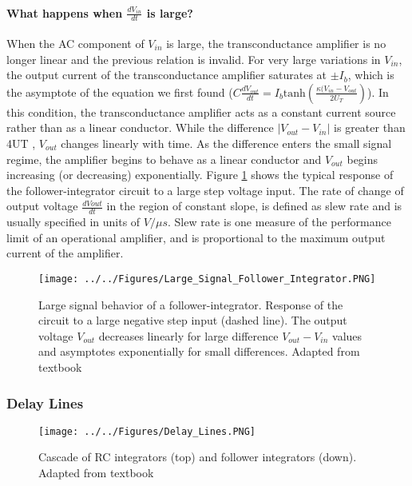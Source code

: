 \paragraph{What happens when $\frac{dV_{in}}{dt}$ is large?}
When the AC component of $V_{in}$ is large, the transconductance amplifier is no longer linear and the previous relation is invalid. For very large variations in $V_{in}$, the output current of the transconductance amplifier saturates at $\pm I_b$, which is the asymptote of the equation we first found ($C \frac{dV_{out}}{dt} = I_b \mathrm{tanh}(\frac{\kappa (V_{in} - V_{out}}{2 U_T})$).  In this condition, the transconductance amplifier
acts as a constant current source rather than as a linear conductor. While the difference $|V_{out} -   V_{in}|$ is greater than 4UT , $V_{out}$ changes linearly with time. As the difference enters the small signal regime, the amplifier begins to behave as a linear conductor and $V_{out}$ begins increasing (or decreasing) exponentially. 
Figure \ref{fig:Large_Signal_Follower_Integrator} shows the typical response of the follower-integrator circuit to
a large step voltage input. The rate of change of output voltage $\frac{dVout}{dt}$ in the region of constant slope, is defined as slew rate and is usually specified in units of $V / \mu s$. Slew rate is one measure of the performance limit of an operational amplifier, and is proportional to the maximum output current of the amplifier.


\begin{figure}[H]
    \centering
    \texttt{[image: ../../Figures/Large\_Signal\_Follower\_Integrator.PNG]}
    \caption{Large signal behavior of a follower-integrator. Response of the circuit to a large negative step input
(dashed line). The output voltage $V_{out}$ decreases linearly for large difference $V_{out} -  V_{in}$ values and asymptotes exponentially for small differences. Adapted from textbook}
    \label{fig:Large_Signal_Follower_Integrator}
\end{figure}

\subsubsection{Delay Lines} 

\begin{figure}[H]
    \centering
    \texttt{[image: ../../Figures/Delay\_Lines.PNG]}
    \caption{Cascade of RC integrators (top) and follower integrators (down). Adapted from textbook}
    \label{fig:Delay_Lines}
\end{figure}

